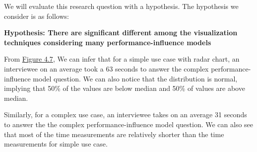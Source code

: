 \begin{description}[leftmargin=0pt]
\begin{minipage}[b]{0.5\textwidth}
\end{minipage}
\begin{center}
\label{scalabilityRatio}
\end{center}

We will evaluate this research question with a hypothesis. The hypothesis we consider is as follows:

\begin{mdframed}
\textbf {Hypothesis: There are significant different among the visualization techniques considering many performance-influence models}
\end{mdframed}

\begin{description}[leftmargin=0pt]
\item[Radar Plot: ]From \hyperref[scalabilityRadar]{Figure 4.7}, We can infer that
for a simple use case with radar chart, an interviewee on an average took a 63 seconds to answer the complex performance-influence model question. We can also notice that the distribution is normal, implying that 50\% of the values are below median and 50\% of values are above median. 

Similarly, for a complex use case, an interviewee takes on an average 31 seconds to answer the the complex performance-influence model question. We can also see that most of the time measurements are relatively shorter than the time measurements for simple use case.


\end{description}
\end{description}
